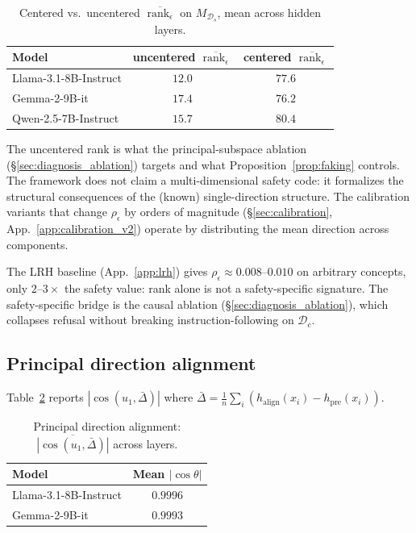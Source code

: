 \documentclass[10pt]{article}
\theoremstyle{definition}
\theoremstyle{remark}
\begin{document}
\begin{table}[h]\centering
\caption{Centered vs.\ uncentered $\overline{\operatorname{rank}_{\epsilon}}$
on $M_{\mathcal{D}_s}$, mean across hidden layers.}
\label{tab:centered_vs_uncentered_body}
\begin{tabular}{@{}lcc@{}}
\toprule
Model & uncentered $\overline{\operatorname{rank}_{\epsilon}}$
      & centered $\overline{\operatorname{rank}_{\epsilon}}$ \\
\midrule
Llama-3.1-8B-Instruct & $12.0$ & $77.6$ \\
Gemma-2-9B-it         & $17.4$ & $76.2$ \\
Qwen-2.5-7B-Instruct  & $15.7$ & $80.4$ \\
\bottomrule
\end{tabular}
\end{table}

The uncentered rank is what the principal-subspace
ablation (\S\ref{sec:diagnosis_ablation}) targets and
what Proposition~\ref{prop:faking} controls.  The
framework does not claim a multi-dimensional safety
code: it formalizes the structural consequences of
the (known) single-direction structure.  The
calibration variants that change $\rho_{\epsilon}$ by
orders of magnitude (\S\ref{sec:calibration},
App.~\ref{app:calibration_v2}) operate by distributing
the mean direction across components.

The LRH baseline (App.~\ref{app:lrh}) gives
$\rho_{\epsilon} \approx 0.008$--$0.010$ on arbitrary
concepts, only $2$--$3\times$ the safety value: rank
alone is not a safety-specific signature.  The
safety-specific bridge is the causal ablation
(\S\ref{sec:diagnosis_ablation}), which collapses
refusal without breaking instruction-following on
$\mathcal{D}_c$.

\subsection{Principal direction alignment}

Table~\ref{tab:diagnosis_cos} reports
$|\cos(u_1, \bar{\Delta})|$ where $\bar{\Delta} =
\frac{1}{n}\sum_i (h_{\mathrm{align}}(x_i)
 - h_{\mathrm{pre}}(x_i))$.

\begin{table}[h]
\centering
\caption{Principal direction alignment:
$\overline{|\cos(u_1, \bar{\Delta})|}$ across layers.}
\label{tab:diagnosis_cos}
\begin{tabular}{@{}lc@{}}
\toprule
Model & Mean $|\cos\theta|$ \\
\midrule
Llama-3.1-8B-Instruct & $0.9996$ \\
Gemma-2-9B-it & $0.9993$ \\
\bottomrule
\end{tabular}
\end{table}
\end{document}
